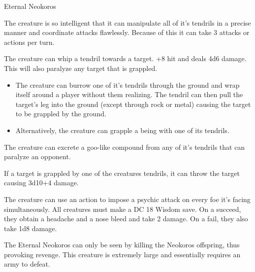 \begin{monsterbox}{Eternal Neokoros}
	\begin{monsteraction}
		The creature is so intelligent that it can manipulate all of it's tendrils in a precise manner and coordinate attacks flawlessly. Because of this it can take 3 attacks or actions per turn.
	\end{monsteraction}
	\begin{monsteraction}
		The creature can whip a tendril towards a target. +8 hit and deals 4d6 damage. This will also paralyze any target that is grappled.
	\end{monsteraction}
	\begin{monsteraction}
		\begin{itemize}
			\item The creature can burrow one of it's tendrils through the ground and wrap itself around a player without them realizing. The tendril can then pull the target's leg into the ground (except through rock or metal) causing the target to be grappled by the ground.
			\item Alternatively, the creature can grapple a being with one of its tendrils.
		\end{itemize}
	\end{monsteraction}
	\begin{monsteraction}
		The creature can excrete a goo-like compound from any of it's tendrils that can paralyze an opponent. 
	\end{monsteraction}
	\begin{monsteraction}
		If a target is grappled by one of the creatures tendrils, it can throw the target causing 3d10+4 damage.
	\end{monsteraction}
	\begin{monsteraction}
		The creature can use an action to impose a psychic attack on every foe it's facing simultaneously. All creatures must make a DC 18 Wisdom save. On a succeed, they obtain a headache and a nose bleed and take 2 damage. On a fail, they also take 1d8 damage.
	\end{monsteraction}
	
	\details[%
	languages = {All},
	challenge = 20
	]
	\dndline%
	The Eternal Neokoros can only be seen by killing the Neokoros offspring, thus provoking revenge. This creature is extremely large and essentially requires an army to defeat.	
		

\end{monsterbox}
